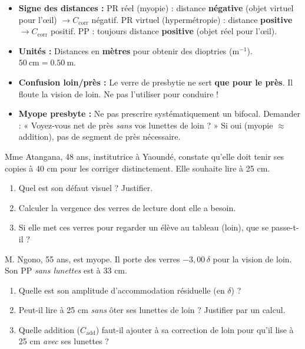 \documentclass[11pt]{article}
\newcounter{popsec}
\newcounter{popsub}
\newcommand{\courssub}[1]{%
  \stepcounter{popsub}%
  \par\vspace{9pt}\noindent{\popxbold\fontsize{11.5}{13}\selectfont\color{popink}{\color{poporange}\thepopsec.\thepopsub}\hspace{6pt}#1}\par\nopagebreak\vspace{4pt}
}
\begin{document}
\begin{attention}
\begin{itemize}
    \item \textbf{Signe des distances :} PR réel (myopie) : distance \textbf{négative} (objet virtuel pour l'œil) $\rightarrow C_{\text{corr}}$ négatif. PR virtuel (hypermétropie) : distance \textbf{positive} $\rightarrow C_{\text{corr}}$ positif. PP : toujours distance \textbf{positive} (objet réel pour l'œil).
    \item \textbf{Unités :} Distances en \textbf{mètres} pour obtenir des dioptries ($\text{m}^{-1}$). $\SI{50}{\centi\meter} = \SI{0,50}{\meter}$.
    \item \textbf{Confusion loin/près :} Le verre de presbytie ne sert \textbf{que pour le près}. Il floute la vision de loin. Ne pas l'utiliser pour conduire !
    \item \textbf{Myope presbyte :} Ne pas prescrire systématiquement un bifocal. Demander : « Voyez-vous net de près \emph{sans} vos lunettes de loin ? » Si oui (myopie $\approx$ addition), pas de segment de près nécessaire.
\end{itemize}
\end{attention}

\courssub{Exercices d'entraînement}

\begin{exercice}
Mme Atangana, 48 ans, institutrice à Yaoundé, constate qu'elle doit tenir ses copies à 40 cm pour les corriger distinctement. Elle souhaite lire à 25 cm.
\begin{enumerate}
    \item Quel est son défaut visuel ? Justifier.
    \item Calculer la vergence des verres de lecture dont elle a besoin.
    \item Si elle met ces verres pour regarder un élève au tableau (loin), que se passe-t-il ?
\end{enumerate}
\end{exercice}

\begin{exercice}
M. Ngono, 55 ans, est myope. Il porte des verres $-3,00\,\delta$ pour la vision de loin. Son PP \emph{sans lunettes} est à 33 cm.
\begin{enumerate}
    \item Quelle est son amplitude d'accommodation résiduelle (en $\delta$) ?
    \item Peut-il lire à 25 cm \emph{sans} ôter ses lunettes de loin ? Justifier par un calcul.
    \item Quelle addition ($C_{\text{add}}$) faut-il ajouter à sa correction de loin pour qu'il lise à 25 cm \emph{avec} ses lunettes ?
\end{enumerate}
\end{exercice}
\end{document}

